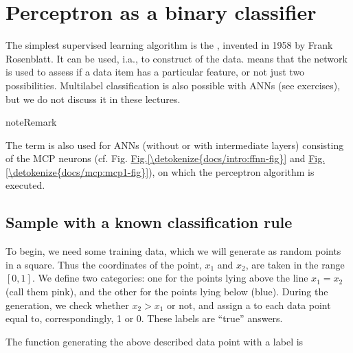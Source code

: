 \documentclass[letterpaper,10pt,english]{jupyterBook}
\begin{document}
\section{Perceptron as a binary classifier}
\label{\detokenize{docs/perceptron:perceptron-as-a-binary-classifier}}
\sphinxAtStartPar
The simplest supervised learning algorithm
is the , invented in 1958 by Frank Rosenblatt. It can be used, i.a., to
construct  of the data.  means that the network
is used to assess if a data item has a particular feature, or not \sphinxhyphen{} just two possibilities. Multi\sphinxhyphen{}label classification is also possible with ANNs (see exercises), but we do not discuss it in these lectures.

\begin{sphinxadmonition}{note}{Remark}

\sphinxAtStartPar
The term  is also used for ANNs (without or with intermediate layers) consisting of the MCP neurons (cf. Fig. \hyperref[\detokenize{docs/intro:ffnn-fig}]{Fig.\@ \ref{\detokenize{docs/intro:ffnn-fig}}} and \hyperref[\detokenize{docs/mcp:mcp1-fig}]{Fig.\@ \ref{\detokenize{docs/mcp:mcp1-fig}}}), on which the perceptron algorithm is executed.
\end{sphinxadmonition}


\subsection{Sample with a known classification rule}
\label{\detokenize{docs/perceptron:sample-with-a-known-classification-rule}}
\sphinxAtStartPar
To begin, we need some training data, which we will generate as random points in a square. Thus the coordinates of the point, \(x_1\) and \(x_2\), are taken in the range \([0,1]\). We define two categories: one for the points lying above the line \(x_1=x_2\) (call them pink), and the other for the points lying below (blue). During the generation, we check whether \(x_2 > x_1\) or not, and assign a  to each data point equal to, correspondingly, 1 or 0. These labels are “true” answers.

\sphinxAtStartPar
The function generating the above described data point with a label is
\end{document}
